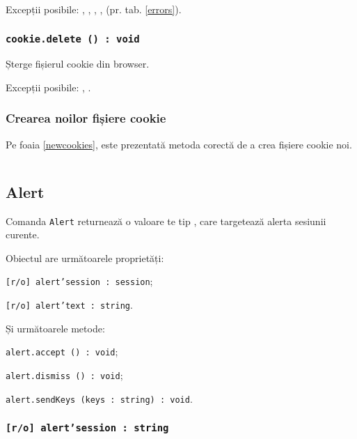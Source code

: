 Excepții posibile: , , , ,  (pr. tab. \ref{errors}).

\subsubsection{\texttt{cookie.delete () : void}}

Șterge fișierul cookie din browser.

Excepții posibile: , .

\subsubsection{Crearea noilor fișiere cookie}

Pe foaia \ref{newcookies}, este prezentată metoda corectă de a crea fișiere cookie noi.

\begin{sourcecode}
    \label{newcookies}
    \inputminted[linenos]{icl}{../sources/newcookies.icL}
\end{sourcecode}


\subsection{{\color{orange} Alert}}

Comanda \texttt{Alert} returnează o valoare te tip  \alert{}, care targetează alerta sesiunii curente.

Obiectul \alert{} are următoarele proprietăți:
\begin{icItems}
	\item \texttt{[r/o] alert'session : session};
	\item \texttt{[r/o] alert'text : string}.
\end{icItems}

Și următoarele metode:
\begin{icItems}
	\item \texttt{alert.accept () : void};
	\item \texttt{alert.dismiss () : void};
	\item \texttt{alert.sendKeys (keys : string) : void}.
\end{icItems}

\subsubsection{\texttt{[r/o] alert'session : string}}

